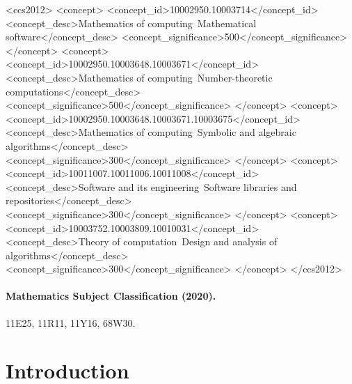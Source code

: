 \documentclass[manuscript,screen]{acmart}
\theoremstyle{plain}
\theoremstyle{definition}
\theoremstyle{nonitalicremark}
\begin{document}
\begin{CCSXML}
<ccs2012>
 <concept>
  <concept_id>10002950.10003714</concept_id>
  <concept_desc>Mathematics of computing~Mathematical software</concept_desc>
  <concept_significance>500</concept_significance>
 </concept>
 <concept>
  <concept_id>10002950.10003648.10003671</concept_id>
  <concept_desc>Mathematics of computing~Number-theoretic computations</concept_desc>
  <concept_significance>500</concept_significance>
 </concept>
 <concept>
  <concept_id>10002950.10003648.10003671.10003675</concept_id>
  <concept_desc>Mathematics of computing~Symbolic and algebraic algorithms</concept_desc>
  <concept_significance>300</concept_significance>
 </concept>
 <concept>
  <concept_id>10011007.10011006.10011008</concept_id>
  <concept_desc>Software and its engineering~Software libraries and repositories</concept_desc>
  <concept_significance>300</concept_significance>
 </concept>
 <concept>
  <concept_id>10003752.10003809.10010031</concept_id>
  <concept_desc>Theory of computation~Design and analysis of algorithms</concept_desc>
  <concept_significance>300</concept_significance>
 </concept>
</ccs2012>
\end{CCSXML}



\maketitle

\paragraph{Mathematics Subject Classification (2020).} 11E25, 11R11, 11Y16, 68W30.

\section{Introduction}
\end{document}

